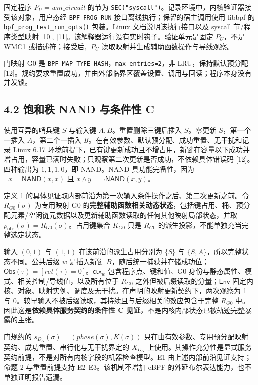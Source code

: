 \documentclass[
  11pt,
  a4paper,
]{ctexart}
\begin{document}
固定程序 \(P_U=\mathit{wm\_circuit}\) 的节为
\texttt{SEC("syscall")}。记录环境中，内核验证器接受该对象，用户态经
\texttt{BPF\_PROG\_RUN} 接口离线执行；保留的宿主调用使用 libbpf 的
\texttt{bpf\_prog\_test\_run\_opts()} 包装。Linux 文档说明该执行接口以及
syscall 节/程序类型映射 {[}10{]},
{[}11{]}。该解释器运行没有实时钩子。验证单元是固定 \(P_U\)，不是 WMC1
或描述符；接受后，\(P_U\) 读取映射并生成辅助函数操作与导线观察。

门映射 G0 是 \texttt{BPF\_MAP\_TYPE\_HASH}，\texttt{max\_entries=2}，非
LRU，保持默认预分配
{[}12{]}。规约要求重置成功，并由外部临界区覆盖设置、调用与回读；程序本身没有并发锁。

\hypertarget{42-ux9971ux548cux79e9-nand-ux4e0eux6761ux4ef6ux6027-c}{%
\subsection{4.2 饱和秩 NAND 与条件性
C}\label{42-ux9971ux548cux79e9-nand-ux4e0eux6761ux4ef6ux6027-c}}

使用互异的哨兵键 \(S\) 与输入键 \(A,B\)。重置删除三键后插入
\(S\)。零更新 \(S\)，第一个一插入 \(A\)，第二个一插入
\(B\)。在有效参数、默认预分配、成功重置、无干扰和记录 Linux 6.17
环境前提下，已有键更新成功且不增占用，新键在容量以下成功并增占用，容量已满时失败；只观察第二次更新是否成功，不依赖具体错误码
{[}12{]}。四种输出为 \(1,1,1,0\)，即 NAND。NAND 具功能完备性，因为
\(\neg x=\mathsf{NAND}(x,x)\) 且 \(x\land y=\neg\mathsf{NAND}(x,y)\)。

定义 1 的具体见证取内部前沿为第一次输入条件操作之后、第二次更新之前。令
\(R_{G0}(\sigma)\) 为专用映射 G0
的\textbf{完整辅助函数相关动态状态}，包括键占用、桶、预分配元素/空闲链元数据以及更新辅助函数读取的任何其他映射局部状态，并取
\(\rho_{\mathrm{obs}}(\sigma)=R_{G0}(\sigma)\)。占用键集合 \(K_{G0}\)
只是 \(R_{G0}\) 的派生投影，不能单独充当完整选定状态。

输入 \((0,1)\) 与 \((1,1)\) 在该前沿的派生占用分别为 \(\{S\}\) 与
\(\{S,A\}\)，所以完整状态不同。公共后缀 \(w\) 是插入新键
\(B\)，随后统一捕获并存储成功位；\(\mathsf{Obs}(\tau)=[\mathit{ret}(\tau)=0]\)。\(\mathsf{ctx}_w\)
包含程序点、键和值、G0
身份与静态属性、模式、相关控制/导线值，以及所有位于 \(R_{G0}\)
之外但被后缀读取的分量；\(\mathsf{Env}\)
固定内核、对象、映射实例、调度及无干扰。在声明的映射更新契约下，两次观察为
1 与 0。较早输入不被后缀读取，其持续且与后缀相关的效应包含于完整
\(R_{G0}\) 中。因此这是\textbf{依赖具体服务契约的条件性 C
见证}，不是内核内部状态已被轨迹完整暴露的主张。

门规约的 \(s_{D_G}(\sigma)=(\mathit{phase}(\sigma),K(\sigma))\)
只在由有效参数、专用预分配映射契约、成功重置、串行化与无干扰界定的
\(X_{D_G}\)
上使用。其操作充分性是显式服务契约前提，不是对所有内核字段的机器检查模型。E1
由上述内部前沿见证支持；命题 2 与重置前提支持 E2--E3。该机制不增加 eBPF
的外延布尔表达能力，也不单独证明报告遗漏。
\end{document}
